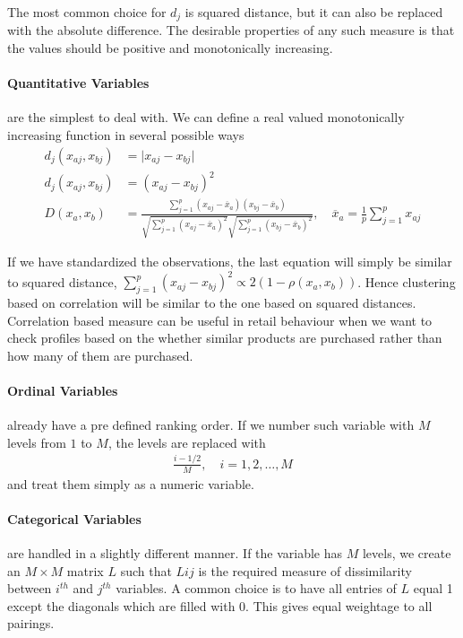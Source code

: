 \documentclass[../statistical_learning_notes.tex]{subfiles}
\begin{document}
    The most common choice for $d_{j}$ is squared distance, but it can also be replaced with the absolute difference. The desirable properties of any such measure is that the values should be positive and monotonically increasing.

    \paragraph{Quantitative Variables} are the simplest to deal with. We can define a real valued monotonically increasing function in several possible ways
    \begin{align*}
        d_{j}(x_{aj}, x_{bj}) &= \lvert x_{aj} - x_{bj} \rvert\\
        d_{j}(x_{aj}, x_{bj}) &= (x_{aj} - x_{bj})^{2}\\
        D(x_{a}, x_{b}) &= \frac{\sum_{j=1}^{p} (x_{aj} - \overline{x}_{a})(x_{bj} - \overline{x}_{b})}{\sqrt{\sum_{j=1}^{p} (x_{aj} - \overline{x}_{a})^{2}} \sqrt{\sum_{j=1}^{p} (x_{bj} - \overline{x}_{b})^{2}}}, \quad \overline{x}_{a} = \frac{1}{p}\sum_{j=1}^{p} x_{aj}
    \end{align*}

    If we have standardized the observations, the last equation will simply be similar to squared distance, $\sum_{j=1}^{p} (x_{aj}-x_{bj})^{2} \propto 2(1 - \rho(x_{a}, x_{b}))$. Hence clustering based on correlation will be similar to the one based on squared distances.\newline
    Correlation based measure can be useful in retail behaviour when we want to check profiles based on the whether similar products are purchased rather than how many of them are purchased.

    \paragraph{Ordinal Variables} already have a pre defined ranking order. If we number such variable with $M$ levels from $1$ to $M$, the levels are replaced with
    \begin{align*}
        \frac{i - 1/2}{M}, \quad i = 1, 2, \ldots, M
    \end{align*}
    and treat them simply as a numeric variable.

    \paragraph{Categorical Variables} are handled in a slightly different manner. If the variable has $M$ levels, we create an $M \times M$ matrix $L$ such that $L{ij}$ is the required measure of dissimilarity between $i^{th}$ and $j^{th}$ variables. A common choice is to have all entries of $L$ equal 1 except the diagonals which are filled with 0. This gives equal weightage to all pairings.\newline
\end{document}
